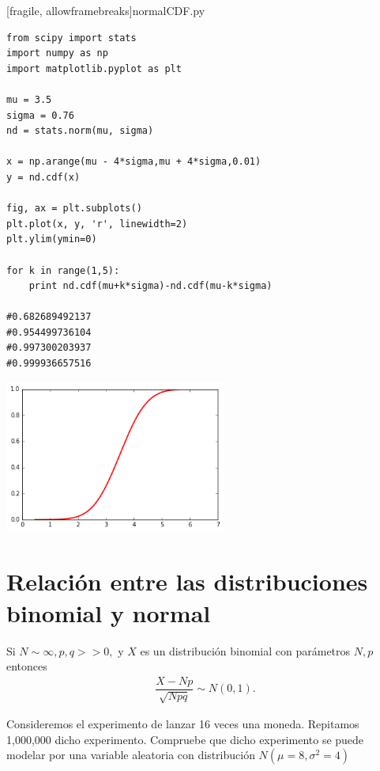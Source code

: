 [fragile, allowframebreaks]{normalCDF.py}
 \begin{verbatim}
from scipy import stats
import numpy as np
import matplotlib.pyplot as plt

mu = 3.5
sigma = 0.76
nd = stats.norm(mu, sigma)

x = np.arange(mu - 4*sigma,mu + 4*sigma,0.01)
y = nd.cdf(x)

fig, ax = plt.subplots()
plt.plot(x, y, 'r', linewidth=2)
plt.ylim(ymin=0)

for k in range(1,5):
    print nd.cdf(mu+k*sigma)-nd.cdf(mu-k*sigma)

#0.682689492137
#0.954499736104
#0.997300203937
#0.999936657516
 \end{verbatim}
\begin{center}
 \includegraphics[height=5cm,keepaspectratio=true]{./pe/normCDF.png}
\end{center}



\section{Relación entre las distribuciones binomial y normal}

 Si $N\sim \infty, p,q>>0,$ y $X$ es un distribución binomial con parámetros $N,p$ entonces
 \begin{align}
  \dfrac{X-Np}{\sqrt{Npq}} \sim N(0,1).
 \end{align}



 \begin{ejemplo}
  \label{exmp:7.5}
  Consideremos el experimento de lanzar 16 veces una moneda. Repitamos 1,000,000 dicho experimento. Compruebe que dicho experimento se puede modelar por una variable aleatoria con distribución $N(\mu=8,\sigma^{2}=4)$
 \end{ejemplo}


